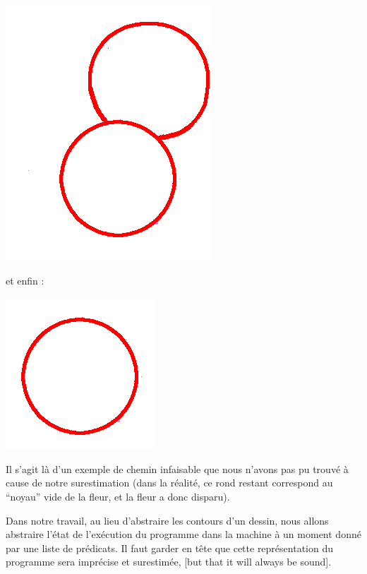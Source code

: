 \documentclass[french]{article}
\begin{document}
  \begin{center}
    \includegraphics[scale=0.19]{./pictures/flower8.png}
  \end{center}
  
  et enfin :

  \begin{center}
    \includegraphics[scale=0.19]{./pictures/flower9.png}
  \end{center}
  
  Il s'agit là d'un exemple de chemin infaisable que nous n'avons pas pu trouvé à cause de notre surestimation (dans la réalité, ce rond restant correspond au ``noyau'' vide de la fleur, et la fleur a donc disparu).
  
  \bigbreak
  
  Dans notre travail, au lieu d'abstraire les contours d'un dessin, nous allons abstraire l'état de l'exécution du programme dans la machine à un moment donné par une liste de prédicats. Il faut garder en tête que cette représentation du programme sera imprécise et surestimée, [but that it will always be sound]. %
\end{document}
